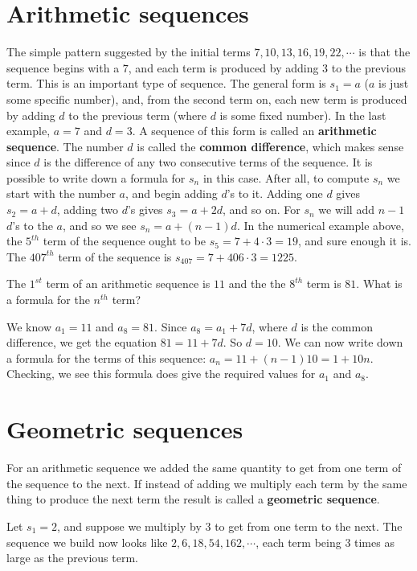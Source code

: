  \section{Arithmetic sequences}
 The simple  pattern suggested by the initial terms $7,10,13,16,19,22,\cdots$ 
 is that the sequence begins with a $7$, and each term is produced
 by adding $3$ to the previous term. This is an
 important type of sequence. The general form is $s_1=a$ ($a$ is just some
 specific number), and, from the second term on, each new term
 is produced by adding $d$ to the previous term (where $d$ is some
 fixed number). In the last example, $a=7$ and $d=3$. A sequence of this
 form is called an {\bfseries arithmetic sequence}. The number $d$ is called
 the {\bfseries common difference}, which makes sense since $d$ is the
 difference of any two consecutive terms of the sequence.   It is
 possible to write down a formula for $s_n$ in this case. After all, to
 compute $s_n$ we start with the number $a$, and begin adding $d$'s to
 it. Adding one $d$ gives $s_2=a+d$, adding two $d$'s gives $s_3=a+2d$, and so
 on. For $s_n$ we will add $n-1$ $d$'s to the $a$, and so we see
 $s_n=a+(n-1)d$. In the numerical example above, the $5^{th}$ term of the
 sequence ought to be $s_5=7+4\cdot3=19$, and sure enough it is. The
 $407^{th}$ term of the sequence is $s_{407}=7+406\cdot3= 1225 $.
 
 \begin{exmp}
  The $1^{st}$ term of an arithmetic sequence is $11$
  and the the $8^{th}$ term is $81$. What is a formula for the $n^{th}$
  term?
  
  We know $a_1 = 11$ and $a_8 = 81$. Since 
  $a_8 = a_1 + 7d$, where $d$ is the common difference, we get the
  equation $81 = 11 + 7d$. So $d=10$. We can now write down a 
  formula for the terms of this sequence: $a_n = 11 + (n-1)10 = 1 + 10n$.
  Checking, we see this formula does give the required values for $a_1$
  and $a_8$.
 \end{exmp}

\section{Geometric sequences}
  For an arithmetic sequence we added the same quantity to get from
one term of the sequence to the next. If instead of adding we multiply
each term by the same thing to produce the next term the result
is called a {\bfseries geometric sequence}. 
 
\begin{exmp}
  Let $s_1=2$, and suppose we multiply by $3$ to get from
 one term to the next.
 The sequence we build now looks like
 $2,6,18,54,162,\cdots$, each term being $3$ times as large as the previous term.
\end{exmp}
 

